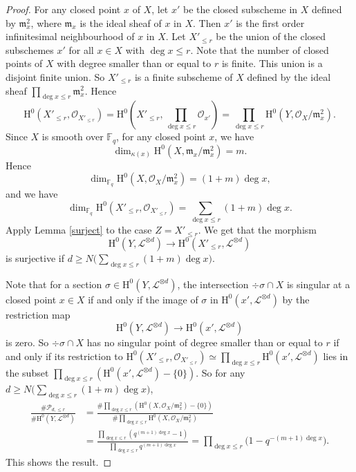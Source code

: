 \documentclass[JEP,XML,SOM,Unicode,published]{cedram}
\theoremstyle{plain}
\theoremstyle{definition}
\newcommand{\ho}{\mathrm{H}}
\newcommand{\li}{\mathcal{L}}
\newcommand{\F}{\mathbb{F}}
\begin{document}
\begin{proof}
For any closed point $x$ of $X$, let $x'$ be the closed subscheme in $X$ defined by $\mathfrak{m}_x^2$, where $\mathfrak{m}_x$ is the ideal sheaf of $x$ in $X$. Then $x'$ is the first order infinitesimal neighbourhood of $x$ in $X$. Let $X'_{\leq r}$ be the union of the closed subschemes $x'$ for all $x\in X$ with $\deg x\leq r$. Note that the number of closed points of $X$ with degree smaller than or equal to $r$ is finite. This union is a disjoint finite union. So $X'_{\leq r}$ is a finite subscheme of $X$ defined by the ideal sheaf $\prod_{\deg x\leq r}\mathfrak{m}_x^2$. Hence
\[
\ho^0(X'_{\leq r},\mathcal{O}_{X'_{\leq r}})=\ho^0(X'_{\leq r}, \prod_{\deg x\leq r } \mathcal{O}_{x'})=\prod_{\deg x\leq r }\ho^0(Y, \mathcal{O}_X/\mathfrak{m}_x^2).
\]
Since $X$ is smooth over $\F_q$, for any closed point $x$, we have
\[
\dim_{\kappa(x)} \ho^0(X, \mathfrak{m}_x/\mathfrak{m}_x^2)=m.
\]
Hence
\[
\dim_{\F_q} \ho^0(X, \mathcal{O}_X/\mathfrak{m}_x^2)=(1+m)\deg x,
\]
and we have
\[
\dim_{\F_q}\ho^0(X'_{\leq r},\mathcal{O}_{X'_{\leq r}})=\sum_{\deg x\leq r} (1+m)\deg x .
\]
Apply Lemma \ref{surject} to the case $Z=X'_{\leq r}$. We get that the morphism
\[
\ho^0(Y, \li^{\otimes d})\to \ho^0(X'_{\leq r}, \li^{\otimes d})
\]
is surjective if $d\geq N\bigl(\sum_{\deg x\leq r}(1+m)\deg x\bigr)$.

Note that for a section $\sigma\in \ho^0(Y, \li^{\otimes d})$, the intersection $\div \sigma\cap X$ is singular at a closed point $x\in X$ if and only if the image of $\sigma$ in $\ho^0(x', \li^{\otimes d})$ by the restriction map
\[
\ho^0(Y, \li^{\otimes d})\to \ho^0(x', \li^{\otimes d})
\]
is zero. So $\div \sigma\cap X$ has no singular point of degree smaller than or equal to $r$ if and only if its restriction to $\ho^0(X'_{\leq r},\mathcal{O}_{X'_{\leq r}})\simeq\prod_{\deg x\leq r }\ho^0(x', \li^{\otimes d})$ lies in the subset $\prod_{\deg x\leq r }\left(\ho^0(x', \li^{\otimes d})-\{0\}\right)$. So for any $d\geq N\bigl(\sum_{\deg x\leq r}(1+m)\deg x\bigr)$,
\begin{align*}
\frac{\#\mathcal{P}_{d,\leq r}}{\#\ho^0(Y, \li^{\otimes d})}&=\frac{\#\prod_{\deg x\leq r }\left(\ho^0(X, \mathcal{O}_X/\mathfrak{m}_x^2)-\{0\}\right)}{\#\prod_{\deg x\leq r }\ho^0(X, \mathcal{O}_X/\mathfrak{m}_x^2)}\\
&=\frac{\prod_{\deg x\leq r }\left(q^{(m+1)\deg x}-1\right)}{\prod_{\deg x\leq r }q^{(m+1)\deg x}}=\prod_{\deg x\leq r} \bigl(1-q^{-(m+1)\deg x} \bigr).
\end{align*}
This shows the result.
\end{proof}
\end{document}
